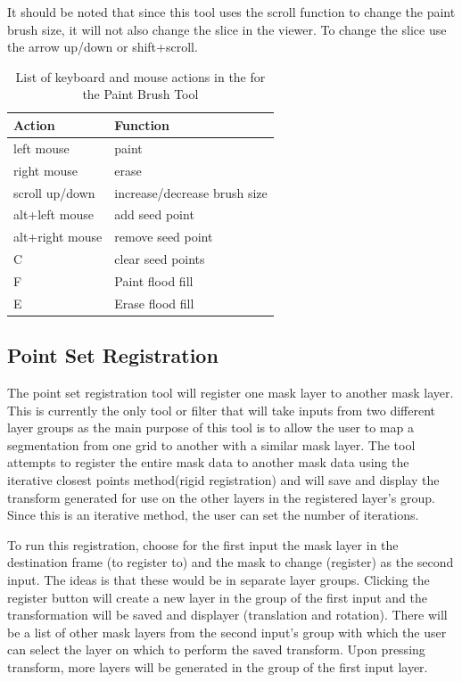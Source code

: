 \documentclass[fleqn,11pt,openany]{book}
\begin{document}
It should be noted that since this tool uses the scroll function to change the paint brush size, it will not also change the slice in the viewer.  To change the slice use the arrow up/down or shift+scroll.  


\begin{table}[h!]
\label{tab:paintkey}
\caption{List of keyboard and mouse actions in the for the Paint Brush Tool}
\begin{tabular}{|l|l|}
\hline
{\bf Action} & {\bf Function}\\
\hline 
left mouse & paint \\
\hline
right mouse & erase\\
\hline
scroll up/down & increase/decrease brush size\\
\hline
alt+left mouse & add seed point\\
\hline
alt+right mouse & remove seed point\\
\hline 
C & clear seed points\\
\hline
F & Paint flood fill\\
\hline
E & Erase flood fill\\ 
\hline
\end{tabular}
\end{table}

\subsection{Point Set Registration}

The point set registration tool will register one mask layer to another mask layer.  This is currently the only tool or filter that will take inputs from two different layer groups as the main purpose of this tool is to allow the user to map a segmentation from one grid to another with a similar mask layer.  The tool attempts to register the entire mask data to another mask data using the iterative closest points method(rigid registration) and will save and display the transform generated for use on the other layers in the registered layer's group.  Since this is an iterative method, the user can set the number of iterations. 

To run this registration, choose for the first input the mask layer in the destination frame (to register to) and the mask to change (register) as the second input.  The ideas is that these would be in separate layer groups.  Clicking the register button will create a new layer in the group of the first input and the transformation will be saved and displayer (translation and rotation).  There will be a list of other mask layers from the second input's group with which the user can select the layer on which to perform the saved transform.  Upon pressing transform, more layers will be generated in the group of the first input layer.  
\end{document}

